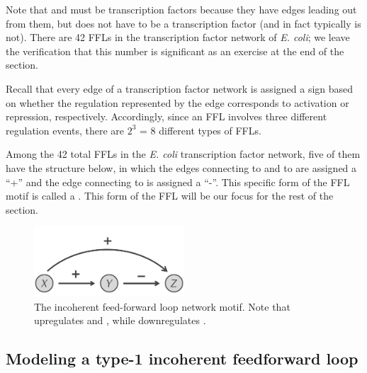 Note that  and  must be transcription factors because they have edges leading out from them, but  does not have to be a transcription factor (and in fact typically is not). There are 42 FFLs in the transcription factor network of \textit{E. coli}; we leave the verification that this number is significant as an exercise at the end of the section.

Recall that every edge of a transcription factor network is assigned a sign based on whether the regulation represented by the edge corresponds to activation or repression, respectively. Accordingly, since an FFL involves three different regulation events, there are $2^3$ = 8 different types of FFLs.

Among the 42 total FFLs in the \textit{E. coli} transcription factor network, five of them have the structure below, in which the edges connecting  to  and  to  are assigned a ``+'' and the edge connecting  to  is assigned a ``-''. This specific form of the FFL motif is  called a . This form of the FFL will be our focus for the rest of the section.\\

\begin{qbox}\end{qbox}

\begin{figure}[h]
\centering
\mySfFamily
\includegraphics[width = 0.5\textwidth]{../images/type-1_incoherent_feed-forward_loop.png}
\caption{The incoherent feed-forward loop network motif. Note that  upregulates  and , while  downregulates .}
\label{fig:type-1_incoherent_feed-forward_loop}
\end{figure}

\FloatBarrier
{}
\subsection{Modeling a type-1 incoherent feedforward loop}

